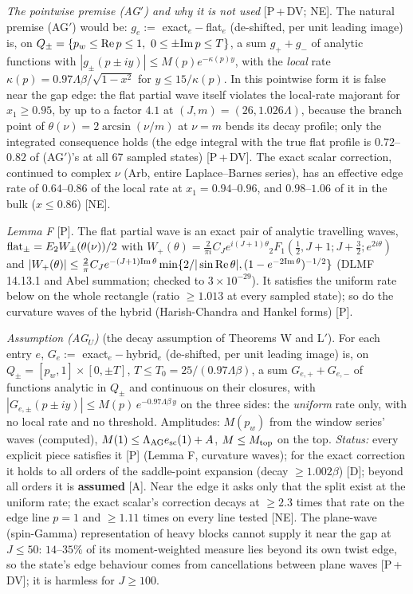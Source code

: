 \documentclass[aps,prl,onecolumn,superscriptaddress,nofootinbib]{revtex4-2}
\begin{document}
\emph{The pointwise premise (AG$'$) and why it is not used} [P\,+\,DV; NE]. The natural premise (AG$'$) would be: $g_e:=$ exact$_e-$flat$_e$ (de-shifted,
per unit leading image) is, on $Q_\pm=\{p_w\le{\rm Re}\,p\le1,\ 0\le\pm{\rm Im}\,p\le T\}$, a sum $g_++g_-$ of analytic functions with
$|g_\pm(p\pm iy)|\le M(p)e^{-\kappa(p)y}$, with the \emph{local} rate $\kappa(p)=0.97\Lambda\beta/\sqrt{1-x^2}$ for $y\le15/\kappa(p)$. In this
pointwise form it is false near the gap edge: the flat partial wave itself violates the local-rate majorant for $x_1\ge0.95$, by up to
a factor $4.1$ at $(J,m)=(26,1.026\Lambda)$, because the branch point of $\theta(\nu)=2\arcsin(\nu/m)$ at $\nu=m$ bends its decay
profile; only the integrated consequence holds (the edge integral with the true flat profile is $0.72$--$0.82$ of (AG$'$)'s at all 67
sampled states) [P\,+\,DV]. The exact scalar correction, continued to complex $\nu$ (Arb, entire Laplace--Barnes series), has an
effective edge rate of $0.64$--$0.86$ of the local rate at $x_1=0.94$--$0.96$, and $0.98$--$1.06$ of it in the bulk ($x\le0.86$) [NE].

\emph{Lemma F} [P]. The flat partial wave is an exact pair of analytic travelling waves, ${\rm flat}_\pm=E_2W_\pm(\theta(\nu))/2$ with
$W_+(\theta)=\tfrac{2}{\pi i}C_Je^{i(J+1)\theta}{}_2F_1(\tfrac12,J+1;J+\tfrac32;e^{2i\theta})$ and
$|W_+(\theta)|\le\tfrac2\pi C_Je^{-(J+1){\rm Im}\,\theta}\min\{2/|\sin{\rm Re}\,\theta|,(1-e^{-2{\rm Im}\,\theta})^{-1/2}\}$ (DLMF 14.13.1 and
Abel summation; checked to $3\times10^{-29}$). It satisfies the uniform rate below on the whole rectangle (ratio $\ge1.013$ at every
sampled state); so do the curvature waves of the hybrid (Harish-Chandra and Hankel forms) [P].

\emph{Assumption (AG$_U$)} (the decay assumption of Theorems W and L$'$). For each entry $e$, $G_e:=$ exact$_e-$hybrid$_e$ (de-shifted,
per unit leading image) is, on $Q_\pm=[p_w,1]\times[0,\pm T]$, $T\le T_0=25/(0.97\Lambda\beta)$, a sum $G_{e,+}+G_{e,-}$ of functions
analytic in $Q_\pm$ and continuous on their closures, with $|G_{e,\pm}(p\pm iy)|\le M(p)\,e^{-0.97\Lambda\beta\,y}$ on the three sides:
the \emph{uniform} rate only, with no local rate and no threshold. Amplitudes: $M(p_w)$ from the window series' waves (computed),
$M(1)\le\Lambda_{\rm AG}e_{\rm sc}(1)+A$, $M\le M_{\rm top}$ on the top. \emph{Status:} every explicit piece satisfies it [P] (Lemma F,
curvature waves); for the exact correction it holds to all orders of the saddle-point expansion (decay $\ge1.002\beta$) [D]; beyond
all orders it is \textbf{assumed} [A]. Near the edge it asks only that the split exist at the uniform rate; the exact scalar's
correction decays at $\ge2.3$ times that rate on the edge line $p=1$ and $\ge1.11$ times on every line tested [NE]. The plane-wave
(spin-Gamma) representation of heavy blocks cannot supply it near the gap at $J\le50$: $14$--$35\%$ of its moment-weighted measure lies
beyond its own twist edge, so the state's edge behaviour comes from cancellations between plane waves [P\,+\,DV]; it is harmless for
$J\ge100$.
\end{document}
